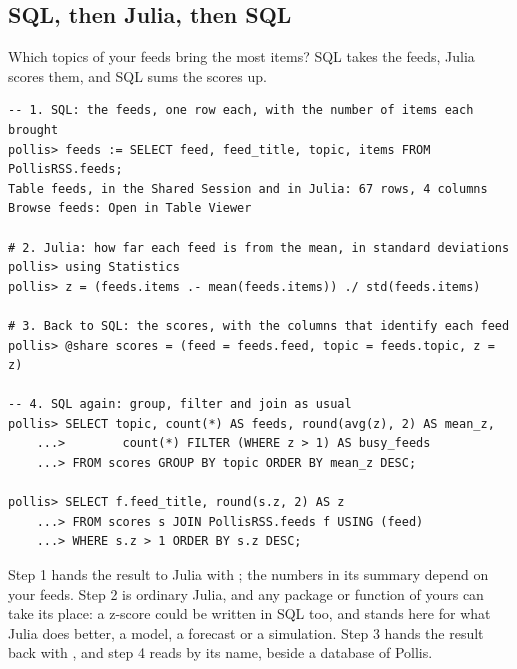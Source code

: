 \subsection{SQL, then Julia, then SQL}
Which topics of your feeds bring the most items? SQL takes the feeds, Julia scores them, and SQL sums the scores up.
\begin{lstlisting}
-- 1. SQL: the feeds, one row each, with the number of items each brought
pollis> feeds := SELECT feed, feed_title, topic, items FROM PollisRSS.feeds;
Table feeds, in the Shared Session and in Julia: 67 rows, 4 columns
Browse feeds: Open in Table Viewer

# 2. Julia: how far each feed is from the mean, in standard deviations
pollis> using Statistics
pollis> z = (feeds.items .- mean(feeds.items)) ./ std(feeds.items)

# 3. Back to SQL: the scores, with the columns that identify each feed
pollis> @share scores = (feed = feeds.feed, topic = feeds.topic, z = z)

-- 4. SQL again: group, filter and join as usual
pollis> SELECT topic, count(*) AS feeds, round(avg(z), 2) AS mean_z,
    ...>        count(*) FILTER (WHERE z > 1) AS busy_feeds
    ...> FROM scores GROUP BY topic ORDER BY mean_z DESC;

pollis> SELECT f.feed_title, round(s.z, 2) AS z
    ...> FROM scores s JOIN PollisRSS.feeds f USING (feed)
    ...> WHERE s.z > 1 ORDER BY s.z DESC;
\end{lstlisting}
Step 1 hands the result to Julia with \file{:=}; the numbers in its summary depend on your feeds. Step 2 is ordinary
Julia, and any package or function of yours can take its place: a z-score could be written in SQL too, and stands here
for what Julia does better, a model, a forecast or a simulation. Step 3 hands the result back with , and
step 4 reads  by its name, beside a database of Pollis.

